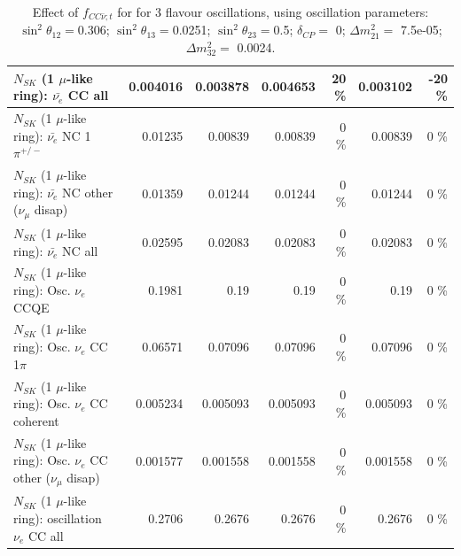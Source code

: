 \begin{table}
\begin{tabular}{| l | r | r | r  r | r  r |}
                            $N_{SK}$ (1 $\mu$-like ring): $\bar{\nu_{e}}$ CC all &        0.004016 &        0.003878 &        0.004653 &       20 \%  &        0.003102 &      -20 \%  \\ 
\hline
                     $N_{SK}$ (1 $\mu$-like ring): $\bar{\nu_e}$ NC 1$\pi^{+/-}$ &         0.01235 &         0.00839 &         0.00839 &        0 \%  &         0.00839 &        0 \%  \\ 
          $N_{SK}$ (1 $\mu$-like ring): $\bar{\nu_e}$ NC other ($\nu_\mu$ disap) &         0.01359 &         0.01244 &         0.01244 &        0 \%  &         0.01244 &        0 \%  \\ 
                            $N_{SK}$ (1 $\mu$-like ring): $\bar{\nu_{e}}$ NC all &         0.02595 &         0.02083 &         0.02083 &        0 \%  &         0.02083 &        0 \%  \\ 
\hline
\hline
\hline
                                 $N_{SK}$ (1 $\mu$-like ring): Osc. $\nu_e$ CCQE &          0.1981 &            0.19 &            0.19 &        0 \%  &            0.19 &        0 \%  \\ 
                            $N_{SK}$ (1 $\mu$-like ring): Osc. $\nu_e$ CC 1$\pi$ &         0.06571 &         0.07096 &         0.07096 &        0 \%  &         0.07096 &        0 \%  \\ 
                          $N_{SK}$ (1 $\mu$-like ring): Osc. $\nu_e$ CC coherent &        0.005234 &        0.005093 &        0.005093 &        0 \%  &        0.005093 &        0 \%  \\ 
           $N_{SK}$ (1 $\mu$-like ring): Osc. $\nu_e$ CC other ($\nu_\mu$ disap) &        0.001577 &        0.001558 &        0.001558 &        0 \%  &        0.001558 &        0 \%  \\ 
                        $N_{SK}$ (1 $\mu$-like ring): oscillation $\nu_e$ CC all &          0.2706 &          0.2676 &          0.2676 &        0 \%  &          0.2676 &        0 \%  \\ 
\hline
\hline
\end{tabular}
\caption{ Effect of $f_{CC\bar{\nu}; t}$ for for 3 flavour oscillations, using oscillation parameters:  $\sin^2\theta_{12} = $0.306; $\sin^2\theta_{13} = $0.0251; $\sin^2\theta_{23} = $0.5; $\delta_{CP} = $        0; $\Delta m^2_{21} = $    7.5e-05; $\Delta m^2_{32} = $    0.0024. }
\label{tab:num_xsec_norm_antinutonu_1RmuT_3f_osc_t13:0.0251}
\end{table}
\clearpage
